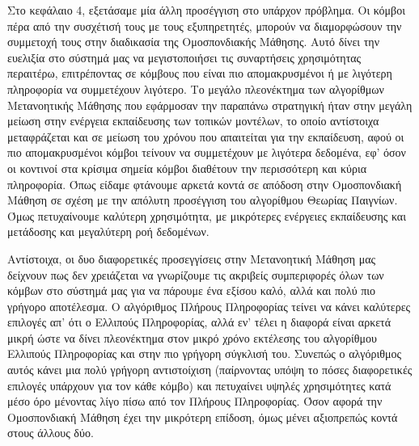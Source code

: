 Στο κεφάλαιο 4, εξετάσαμε μία άλλη προσέγγιση στο υπάρχον πρόβλημα. Οι κόμβοι πέρα από την συσχέτισή τους με τους εξυπηρετητές, μπορούν να διαμορφώσουν την συμμετοχή τους στην διαδικασία της Ομοσπονδιακής Μάθησης. Αυτό δίνει την ευελιξία στο σύστημά μας να μεγιστοποιήσει τις συναρτήσεις χρησιμότητας περαιτέρω, επιτρέποντας σε κόμβους που είναι πιο απομακρυσμένοι ή με λιγότερη πληροφορία να συμμετέχουν λιγότερο. Το μεγάλο πλεονέκτημα των αλγορίθμων Μετανοητικής Μάθησης που εφάρμοσαν την παραπάνω στρατηγική ήταν στην μεγάλη μείωση στην ενέργεια εκπαίδευσης των τοπικών μοντέλων, το οποίο αντίστοιχα μεταφράζεται και σε μείωση του χρόνου που απαιτείται για την εκπαίδευση, αφού οι πιο απομακρυσμένοι κόμβοι τείνουν να συμμετέχουν με λιγότερα δεδομένα, εφ' όσον οι κοντινοί στα κρίσιμα σημεία κόμβοι διαθέτουν την περισσότερη και κύρια πληροφορία. Όπως είδαμε φτάνουμε αρκετά κοντά σε απόδοση στην Ομοσπονδιακή Μάθηση σε σχέση με την απόλυτη προσέγγιση του αλγορίθμου Θεωρίας Παιγνίων. Όμως πετυχαίνουμε καλύτερη χρησιμότητα, με μικρότερες ενέργειες εκπαίδευσης και μετάδοσης και μεγαλύτερη ροή δεδομένων.

Αντίστοιχα, οι δυο διαφορετικές προσεγγίσεις στην Μετανοητική Μάθηση μας δείχνουν πως δεν χρειάζεται να γνωρίζουμε τις ακριβείς συμπεριφορές όλων των κόμβων στο σύστημά μας για να πάρουμε ένα εξίσου καλό, αλλά και πολύ πιο γρήγορο αποτέλεσμα. Ο αλγόριθμος Πλήρους Πληροφορίας τείνει να κάνει καλύτερες επιλογές απ' ότι ο Ελλιπούς Πληροφορίας, αλλά εν' τέλει η διαφορά είναι αρκετά μικρή ώστε να δίνει πλεονέκτημα στον μικρό χρόνο εκτέλεσης του αλγορίθμου Ελλιπούς Πληροφορίας και στην πιο γρήγορη σύγκλισή του. Συνεπώς ο αλγόριθμος αυτός κάνει μια πολύ γρήγορη αντιστοίχιση (παίρνοντας υπόψη το πόσες διαφορετικές επιλογές υπάρχουν για τον κάθε κόμβο) και πετυχαίνει υψηλές χρησιμότητες κατά μέσο όρο μένοντας λίγο πίσω από τον Πλήρους Πληροφορίας. Όσον αφορά την Ομοσπονδιακή Μάθηση έχει την μικρότερη επίδοση, όμως μένει αξιοπρεπώς κοντά στους άλλους δύο.

